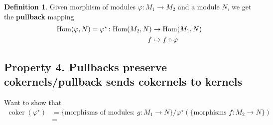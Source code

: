 \documentclass[12pt]{article}
\newcommand{\ho}[2]{\textup{Hom}(#1,#2)}
\DeclareMathOperator{\cok}{coker}
\newcommand{\mapping}[5]{\begin{align*}
#1\colon #2 &\to #3\\
#4 & \mapsto #5
\end{align*}}
\theoremstyle{definition}
\newtheorem{definition}[theorem]{Definition}
\begin{document}
\begin{definition}
Given morphism of modules $\varphi:M_1 \rightarrow M_2$ and a module $N$, we get the \textbf{pullback} mapping
\[
\mapping{\ho{\varphi}{N}= \varphi^\star}{\ho{M_2}{N}}{\ho{M_1}{N}}{f}{f\circ \varphi}
\]
\end{definition}
\subsection*{Property 4. Pullbacks preserve cokernels/pullback sends cokernels to kernels}
Want to show that
\begin{align*}
    \cok(\varphi^\star) &= \{\text{morphisms of modules: }g:M_1\rightarrow N\}/\varphi^\star (\{\text{morphisms }f:M_2\rightarrow N\})\\
    &=
\end{align*}
\end{document}

